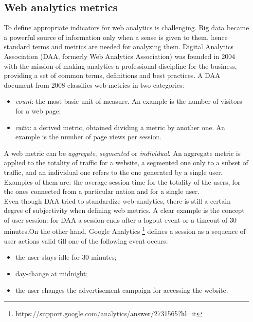 \subsection{Web analytics metrics}
To define appropriate indicators for web analytics is challenging. Big data became a powerful source of information only when a sense is given to them, hence standard terms and metrics are needed for analyzing them. Digital Analytics Association (DAA, formerly Web Analytics Association) was founded in 2004 with the mission of making analytics a professional discipline for the business, providing a set of common terms, definitions and best practices. A DAA document \cite{bib27} from 2008 classifies web metrics in two categories:
\begin{itemize}
\item \textit{count}: the most basic unit of measure. An example is the number of visitors for a web page;
\item \textit{ratio}: a derived metric, obtained dividing a metric by another one. An example is the number of page views per session.
\end{itemize}
A web metric can be \textit{aggregate}, \textit{segmented} or \textit{individual}. An aggregate metric is applied to the totality of traffic for a website, a segmented one only to a subset of traffic, and an individual one refers to the one generated by a single user. Examples of them are: the average session time for the totality of the users, for the ones connected from a particular nation and for a single user.\\
Even though DAA tried to standardize web analytics, there is still a certain degree of subjectivity when defining web metrics. A clear example is the concept of user session: for DAA a session ends after a logout event or a timeout of 30 minutes.On the other hand, Google Analytics \footnote{https://support.google.com/analytics/answer/2731565?hl=it} defines a session as a sequence of user actions valid till one of the following event occurs:
\begin{itemize}
\item the user stays idle for 30 minutes;
\item day-change at midnight;
\item the user changes the advertisement campaign for accessing the website.
\end{itemize}

